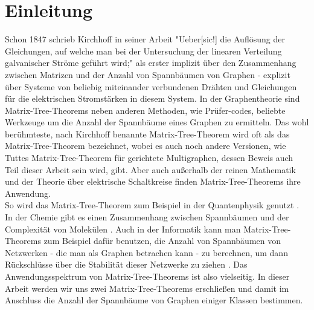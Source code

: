\section{Einleitung}
Schon 1847 schrieb Kirchhoff in seiner Arbeit "Ueber[sic!] die Auflösung der Gleichungen, auf welche man bei der Untersuchung der linearen Verteilung galvanischer Ströme geführt wird;"\cite{kirchhoff_1847} als erster implizit über den Zusammenhang zwischen Matrizen und der Anzahl von Spannbäumen von Graphen - explizit über Systeme von beliebig miteinander verbundenen Drähten und Gleichungen für die elektrischen Stromstärken in diesem System.
In der Graphentheorie sind Matrix-Tree-Theorems neben anderen Methoden, wie Prüfer-codes, beliebte Werkzeuge um die Anzahl der Spannbäume eines Graphen zu ermitteln.
Das wohl berühmteste, nach Kirchhoff benannte Matrix-Tree-Theorem wird oft als das Matrix-Tree-Theorem bezeichnet, wobei es auch noch andere Versionen, wie Tuttes Matrix-Tree-Theorem für gerichtete Multigraphen, dessen Beweis auch Teil dieser Arbeit sein wird, gibt.
Aber auch außerhalb der reinen Mathematik und der Theorie über elektrische Schaltkreise finden Matrix-Tree-Theorems ihre Anwendung.\\
So wird das Matrix-Tree-Theorem zum Beispiel in der Quantenphysik genutzt \cite{giovannetti_severini_2013}.
In der Chemie gibt es einen Zusammenhang zwischen Spannbäumen und der Complexität von Molekülen \cite{janezic_2015}.
Auch in der Informatik kann man Matrix-Tree-Theorems zum Beispiel dafür benutzen, die Anzahl von Spannbäumen von Netzwerken - die man als Graphen betrachen kann - zu berechnen, um dann Rück\-schlüsse über die Stabilität dieser Netzwerke zu ziehen \cite{yakoubi_2019}.
Das Anwendungsspektrum von Matrix-Tree-Theorems ist also vielseitig.
In dieser Arbeit werden wir uns zwei Matrix-Tree-Theorems erschließen und damit im Anschluss die Anzahl der Spannbäume von Graphen einiger Klassen bestimmen.

